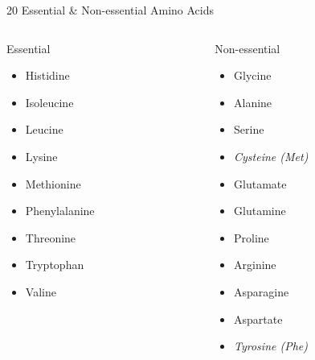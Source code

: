 \documentclass[presentation, smaller]{beamer}
\begin{document}
\begin{frame}[label={sec:orgheadline5}]{20 Essential \& Non-essential Amino Acids}
\begin{columns}
\begin{column}{0.45\columnwidth}
\begin{block}{Essential}
\begin{itemize}
\item Histidine
\item Isoleucine
\item Leucine
\item Lysine
\item Methionine
\item Phenylalanine
\item Threonine
\item Tryptophan
\item Valine
\end{itemize}
\end{block}
\end{column}

\begin{column}{0.45\columnwidth}
\begin{block}{Non-essential}
\begin{itemize}
\item Glycine
\item Alanine
\item Serine
\item \emph{Cysteine (Met)}
\item Glutamate
\item Glutamine
\item Proline
\item Arginine
\item Asparagine
\item Aspartate
\item \emph{Tyrosine (Phe)}
\end{itemize}
\end{block}
\end{column}
\end{columns}
\end{frame}
\end{document}
